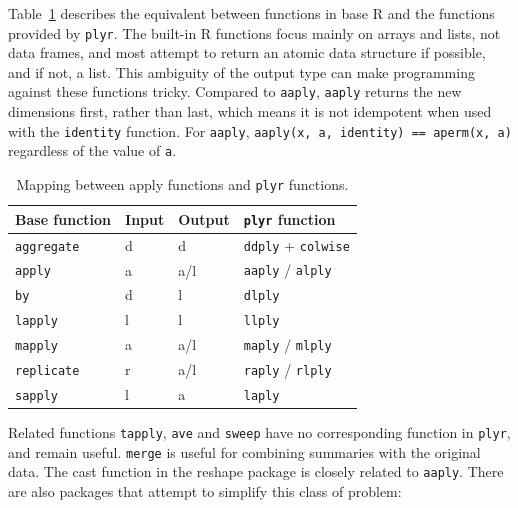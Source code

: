 \documentclass{scrartcl}
\newcommand{\code}[1]{\lstinline!#1!}
\newcommand{\plyr}{{\tt plyr}\xspace}
\begin{document}
Table~\ref{tbl:equiv} describes the equivalent between functions in base R and the functions provided by {\tt plyr}. The built-in R functions focus mainly on arrays and lists, not data frames, and most attempt to return an atomic data structure if possible, and if not, a list. This ambiguity of the output type can make programming against these functions tricky. Compared to {\tt aaply}, {\tt aaply} returns the new dimensions first, rather than last, which means it is not idempotent when used with the \code{identity} function. For \code{aaply}, {\tt aaply(x, a, identity) == aperm(x, a)} regardless of the value of {\tt a}.

\begin{table}[htpb]
  \begin{center}
  \begin{tabular}{llll}
    \toprule
    Base function & Input & Output & \plyr function \\
    \midrule
    \code{aggregate} & d & d   & \code{ddply} + \code{colwise} \\
    \code{apply}     & a & a/l & \code{aaply} / \code{alply} \\
    \code{by}        & d & l   & \code{dlply} \\
    \code{lapply}    & l & l   & \code{llply} \\
    \code{mapply}    & a & a/l & \code{maply} / \code{mlply} \\
    \code{replicate} & r & a/l & \code{raply} / \code{rlply} \\
    \code{sapply}    & l & a   & \code{laply} \\
    \bottomrule
  \end{tabular}
  \end{center}
  \caption{Mapping between apply functions and \plyr functions.}
  \label{tbl:equiv}
\end{table}

Related functions {\tt tapply}, {\tt ave} and {\tt sweep} have no corresponding function in {\tt plyr}, and remain useful. {\tt merge} is useful for combining summaries with the original data.  The cast function in the reshape package \citep{reshape} is closely related to {\tt aaply}.  There are also packages that attempt to simplify this class of problem:
\end{document}
